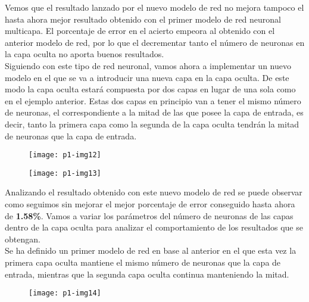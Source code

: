 \documentclass[10pt]{article}
\begin{document}
Vemos que el resultado lanzado por el nuevo modelo de red no mejora tampoco el hasta ahora mejor resultado obtenido con el primer modelo de red neuronal multicapa. El porcentaje de error en el acierto empeora al obtenido con el anterior modelo de red, por lo que el decrementar tanto el número de neuronas en la capa oculta no aporta buenos resultados. \\

Siguiendo con este tipo de red neuronal, vamos ahora a implementar un nuevo modelo en el que se va a introducir una nueva capa en la capa oculta. De este modo la capa oculta estará compuesta por dos capas en lugar de una sola como en el ejemplo anterior. Estas dos capas en principio van a tener el mismo número de neuronas, el correspondiente a la mitad de las que posee la capa de entrada, es decir, tanto la primera capa como la segunda de la capa oculta tendrán la mitad de neuronas que la capa de entrada. \\

\begin{figure}[H]
	\begin{center}
 		\texttt{[image: p1-img12]}
	\end{center} 
\end{figure}

\begin{figure}[H]
	\begin{center}
 		\texttt{[image: p1-img13]}
	\end{center} 
\end{figure}

Analizando el resultado obtenido con este nuevo modelo de red se puede observar como seguimos sin mejorar el mejor porcentaje de error conseguido hasta ahora de \textbf{1.58\%}. Vamos a variar los parámetros del número de neuronas de las capas dentro de la capa oculta para analizar el comportamiento de los resultados que se obtengan. \\

Se ha definido un primer modelo de red en base al anterior en el que esta vez la primera capa oculta mantiene el mismo número de neuronas que la capa de entrada, mientras que la segunda capa oculta continua manteniendo la mitad. \\

\begin{figure}[H]
	\begin{center}
 		\texttt{[image: p1-img14]}
	\end{center} 
\end{figure}
\end{document}
